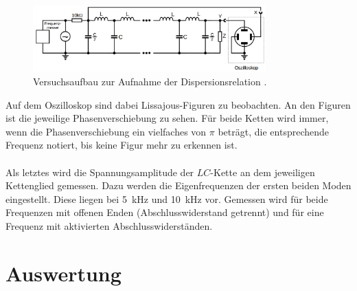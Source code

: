 \documentclass[
  bibliography=totoc,     %
  captions=tableheading,  %
  titlepage=firstiscover, %
]{scrartcl}
\begin{document}
\begin{figure}
  \centering
  \includegraphics[width=0.8\textwidth]{V3569.png}
  \caption{Versuchsaufbau zur Aufnahme der Dispersionsrelation \cite{anleitung}.}
  \label{fig:V3569}
\end{figure}
Auf dem Oszilloskop sind dabei Lissajous-Figuren zu beobachten. An den Figuren
ist die jeweilige Phasenverschiebung zu sehen. Für beide Ketten wird immer, wenn
die Phasenverschiebung ein vielfaches von $\pi$ beträgt, die entsprechende
Frequenz notiert, bis keine Figur mehr zu erkennen ist.\\
\\
Als letztes wird die Spannungsamplitude der $LC$-Kette an dem jeweiligen
Kettenglied gemessen. Dazu werden die Eigenfrequenzen der ersten beiden Moden
eingestellt. Diese liegen bei \SI{5}{\kilo\hertz} und \SI{10}{\kilo\hertz} vor.
Gemessen wird für beide Frequenzen mit offenen Enden
(Abschlusswiderstand getrennt) und für eine Frequenz mit aktivierten
Abschlusswiderständen.
\clearpage
\section{Auswertung}
\label{sec:auswertung}
\end{document}
